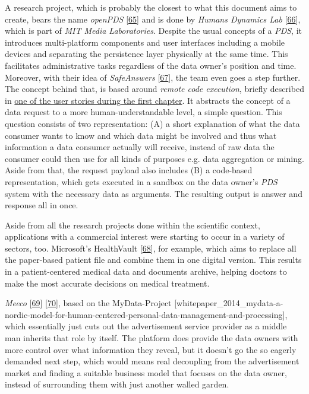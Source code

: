 \documentclass[12pt,english,a4paper,titlepage,cleardoublepage=empty,dottedtoc]{report}
\begin{document}
A research project, which is probably the closest to what this document
aims to create, bears the name \emph{openPDS}
{[}\protect\hyperlink{ref-paper_2012_openpds_on-trusted-use-of-large-scale-personal-data}{65}{]}
and is done by \emph{Humans Dynamics Lab}
{[}\protect\hyperlink{ref-web_mit_openpds-safeanswers-project-page}{66}{]},
which is part of \emph{MIT Media Laboratories}. Despite the usual
concepts of a \emph{PDS}, it introduces multi-platform components and
user interfaces including a mobile devices and separating the
persistence layer physically at the same time. This facilitates
administrative tasks regardless of the data owner's position and time.
Moreover, with their idea of \emph{SafeAnswers}
{[}\protect\hyperlink{ref-paper_2014_openpds_protecting-privacy-of-meta-data-through-safeanswers}{67}{]},
the team even goes a step further. The concept behind that, is based
around \emph{remote code execution}, briefly described in
\protect\hyperlink{header-applying-for-a-loan-and-checking-creditworthiness}{one
of the user stories during the first chapter}. It abstracts the concept
of a data request to a more human-understandable level, a simple
question. This question consists of two representation: (A) a short
explanation of what the data consumer wants to know and which data might
be involved and thus what information a data consumer actually will
receive, instead of raw data the consumer could then use for all kinds
of purposes e.g. data aggregation or mining. Aside from that, the
request payload also includes (B) a code-based representation, which
gets executed in a sandbox on the data owner's \emph{PDS} system with
the necessary data as arguments. The resulting output is answer and
response all in once.

Aside from all the research projects done within the scientific context,
applications with a commercial interest were starting to occur in a
variety of sectors, too. Microsoft's HealthVault
{[}\protect\hyperlink{ref-web_microsoft_healthvault}{68}{]}, for
example, which aims to replace all the paper-based patient file and
combine them in one digital version. This results in a patient-centered
medical data and documents archive, helping doctors to make the most
accurate decisions on medical treatment.

\emph{Meeco} {[}\protect\hyperlink{ref-web_meeco_how-it-works}{69}{]}
{[}\protect\hyperlink{ref-slides_2015_meeco-case-study}{70}{]}, based on
the MyData-Project
{[}whitepaper\_2014\_mydata-a-nordic-model-for-human-centered-personal-data-management-and-processing{]},
which essentially just cuts out the advertisement service provider as a
middle man inherits that role by itself. The platform does provide the
data owners with more control over what information they reveal, but it
doesn't go the so eagerly demanded next step, which would means real
decoupling from the advertisement market and finding a suitable business
model that focuses on the data owner, instead of surrounding them with
just another walled garden.
\end{document}
